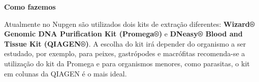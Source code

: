 \documentclass[
  letterpaper,
  DIV=11,
  numbers=noendperiod]{scrreprt}
\begin{document}
\begin{tcolorbox}[enhanced jigsaw, colback=white, toprule=.15mm, rightrule=.15mm, opacityback=0, left=2mm, arc=.35mm, bottomrule=.15mm, breakable, leftrule=.75mm]
\begin{minipage}[t]{5.5mm}
\textcolor{quarto-callout-note-color}{\faInfo}
\end{minipage}%
\begin{minipage}[t]{\textwidth - 5.5mm}

\textbf{Como fazemos}\vspace{2mm}

Atualmente no Nupgen são utilizados dois kits de extração diferentes:
\textbf{Wizard® Genomic DNA Purification Kit (Promega®)} e
\textbf{DNeasy® Blood and Tissue Kit (QIAGEN®)}. A escolha do kit irá
depender do organismo a ser estudado, por exemplo, para peixes,
gastrópodes e macrófitas recomenda-se a utilização do kit da Promega e
para organismos menores, como parasitas, o kit em colunas da QIAGEN é o
mais ideal.

\end{minipage}%
\end{tcolorbox}
\end{document}
